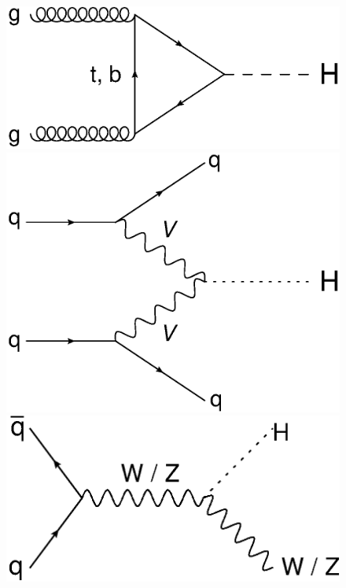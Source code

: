 			\begin{figure}[h]
				\centering
					\begin{minipage}[h]{0.4\linewidth}
						\includegraphics[width=1\linewidth]{T/FIGS/ggF}
					\end{minipage}
					\quad\quad
					\begin{minipage}[h]{0.4\linewidth}
						\includegraphics[width=1\linewidth]{T/FIGS/vbf}
					\end{minipage}
					\begin{minipage}[h]{0.4\linewidth}
						\includegraphics[width=1\linewidth]{T/FIGS/whzh}

\end{minipage}
\end{figure}
